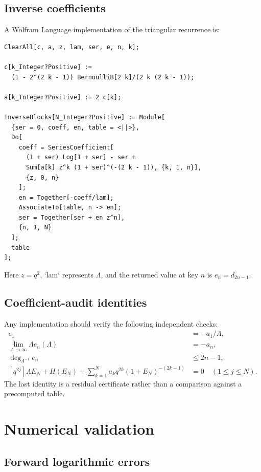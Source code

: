 \documentclass[11pt,a4paper,oneside]{book}
\newcommand{\coeff}[2]{\left[#1\right]#2}
\begin{document}
\section{Inverse coefficients}

A Wolfram Language implementation of the triangular recurrence is:

\begin{lstlisting}
ClearAll[c, a, z, lam, ser, e, n, k];

c[k_Integer?Positive] :=
  (1 - 2^(2 k - 1)) BernoulliB[2 k]/(2 k (2 k - 1));

a[k_Integer?Positive] := 2 c[k];

InverseBlocks[N_Integer?Positive] := Module[
  {ser = 0, coeff, en, table = <||>},
  Do[
    coeff = SeriesCoefficient[
      (1 + ser) Log[1 + ser] - ser +
      Sum[a[k] z^k (1 + ser)^(-(2 k - 1)), {k, 1, n}],
      {z, 0, n}
    ];
    en = Together[-coeff/lam];
    AssociateTo[table, n -> en];
    ser = Together[ser + en z^n],
    {n, 1, N}
  ];
  table
];
\end{lstlisting}

Here \(z=q^2\), `lam` represents \(\Lambda\), and the returned value at key
\(n\) is \(e_n=d_{2n-1}\).

\section{Coefficient-audit identities}

Any implementation should verify the following independent checks:
\begin{align}
 e_1&=-a_1/\Lambda,\label{eq:audit1}\\
 \lim_{\Lambda\to\infty}\Lambda e_n(\Lambda)&=-a_n,\label{eq:audit2}\\
 \deg_{\Lambda^{-1}}e_n&\le2n-1,\label{eq:audit3}\\
 \coeff{q^{2j}}{
 \Lambda E_N+H(E_N)+
 \sum_{k=1}^Na_kq^{2k}(1+E_N)^{-(2k-1)}
 }&=0
 \quad(1\le j\le N).
 \label{eq:audit4}
\end{align}
The last identity is a residual certificate rather than a comparison against
a precomputed table.

\chapter{Numerical validation}

\section{Forward logarithmic errors}
\end{document}
